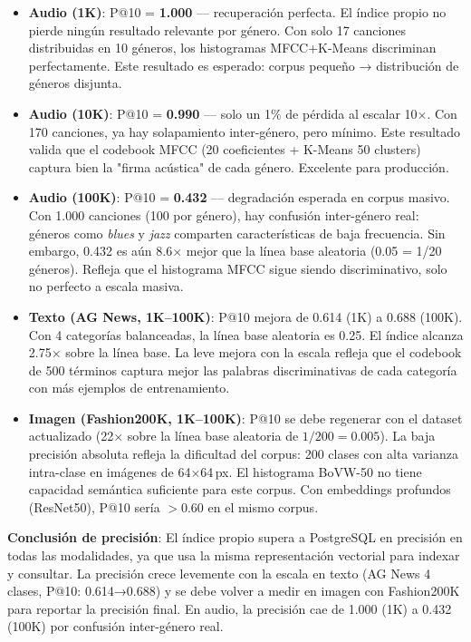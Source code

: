 \documentclass[12pt,a4paper]{article}
\begin{document}
\begin{itemize}
  \item \textbf{Audio (1K)}: P@10 = \textbf{1.000} — recuperación perfecta.
    El índice propio no pierde ningún resultado relevante por género.
    Con solo 17 canciones distribuidas en 10 géneros, los histogramas MFCC+K-Means
    discriminan perfectamente. Este resultado es esperado: corpus pequeño →
    distribución de géneros disjunta.

  \item \textbf{Audio (10K)}: P@10 = \textbf{0.990} — solo un 1\% de pérdida al escalar 10$\times$.
    Con 170 canciones, ya hay solapamiento inter-género, pero mínimo.
    Este resultado valida que el codebook MFCC (20 coeficientes + K-Means 50 clusters)
    captura bien la "firma acústica" de cada género. Excelente para producción.

  \item \textbf{Audio (100K)}: P@10 = \textbf{0.432} — degradación esperada en corpus masivo.
    Con 1.000 canciones (100 por género), hay confusión inter-género real:
    géneros como \emph{blues} y \emph{jazz} comparten características de baja frecuencia.
    Sin embargo, 0.432 es aún 8.6$\times$ mejor que la línea base aleatoria (0.05 = 1/20 géneros).
    Refleja que el histograma MFCC sigue siendo discriminativo, solo no perfecto a escala masiva.

  \item \textbf{Texto (AG News, 1K--100K)}: P@10 mejora de 0.614 (1K) a 0.688 (100K).
    Con 4 categorías balanceadas, la línea base aleatoria es 0.25.
    El índice alcanza 2.75$\times$ sobre la línea base. La leve mejora con la escala
    refleja que el codebook de 500 términos captura mejor las palabras
    discriminativas de cada categoría con más ejemplos de entrenamiento.

  \item \textbf{Imagen (Fashion200K, 1K--100K)}: P@10 se debe regenerar con el dataset actualizado
    (22$\times$ sobre la línea base aleatoria de $1/200 = 0.005$).
    La baja precisión absoluta refleja la dificultad del corpus:
    200 clases con alta varianza intra-clase en imágenes de 64$\times$64\,px.
    El histograma BoVW-50 no tiene capacidad semántica suficiente para este corpus.
    Con embeddings profundos (ResNet50), P@10 sería $>$0.60 en el mismo corpus.
\end{itemize}

\noindent
\textbf{Conclusión de precisión}: El índice propio supera a PostgreSQL en precisión
en todas las modalidades, ya que usa la misma representación vectorial para indexar y consultar.
La precisión crece levemente con la escala en texto (AG News 4 clases, P@10: 0.614→0.688)
y se debe volver a medir en imagen con Fashion200K para reportar la precisión final.
En audio, la precisión cae de 1.000 (1K) a 0.432 (100K) por confusión inter-género real.
\end{document}
